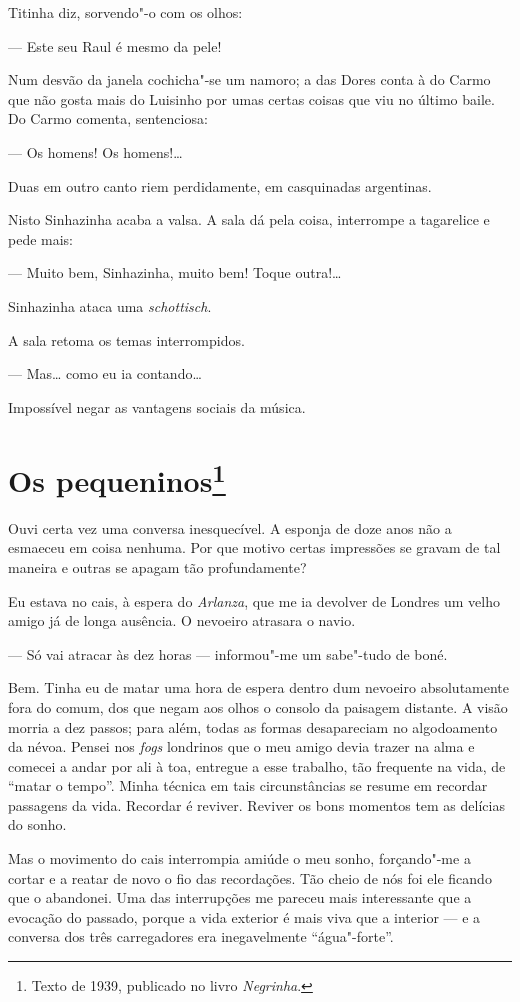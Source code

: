Titinha diz, sorvendo"-o com os olhos:

--- Este seu Raul é mesmo da pele!

Num desvão da janela cochicha"-se um namoro; a das Dores conta à do Carmo
que não gosta mais do Luisinho por umas certas coisas que viu no último
baile. Do Carmo comenta, sentenciosa:

--- Os homens! Os homens!\ldots{}

Duas em outro canto riem perdidamente, em casquinadas argentinas.

Nisto Sinhazinha acaba a valsa. A sala dá pela coisa, interrompe a
tagarelice e pede mais:

--- Muito bem, Sinhazinha, muito bem! Toque outra!\ldots{}

Sinhazinha ataca uma \emph{schottisch}.

A sala retoma os temas interrompidos.

--- Mas\ldots{} como eu ia contando\ldots{}

Impossível negar as vantagens sociais da música.

\chapter{Os pequeninos\footnote[*]{Texto de 1939, publicado no livro \emph{Negrinha}.}}

Ouvi certa vez uma conversa inesquecível. A esponja de doze anos não a
esmaeceu em coisa nenhuma. Por que motivo certas impressões se gravam de
tal maneira e outras se apagam tão profundamente?

Eu estava no cais, à espera do \emph{Arlanza}, que me ia devolver de
Londres um velho amigo já de longa ausência. O nevoeiro atrasara o
navio.

--- Só vai atracar às dez horas --- informou"-me um sabe"-tudo de boné.

Bem. Tinha eu de matar uma hora de espera dentro dum nevoeiro
absolutamente fora do comum, dos que negam aos olhos o consolo da
paisagem distante. A visão morria a dez passos; para além, todas as
formas desapareciam no algodoamento da névoa. Pensei nos \emph{fogs}
londrinos que o meu amigo devia trazer na alma e comecei a andar por ali
à toa, entregue a esse trabalho, tão frequente na vida, de ``matar o
tempo''. Minha técnica em tais circunstâncias se resume em recordar
passagens da vida. Recordar é reviver. Reviver os bons momentos tem as
delícias do sonho.

Mas o movimento do cais interrompia amiúde o meu sonho, forçando"-me a
cortar e a reatar de novo o fio das recordações. Tão cheio de nós foi
ele ficando que o abandonei. Uma das interrupções me pareceu mais
interessante que a evocação do passado, porque a vida exterior é mais
viva que a interior --- e a conversa dos três carregadores era
inegavelmente ``água"-forte''.

